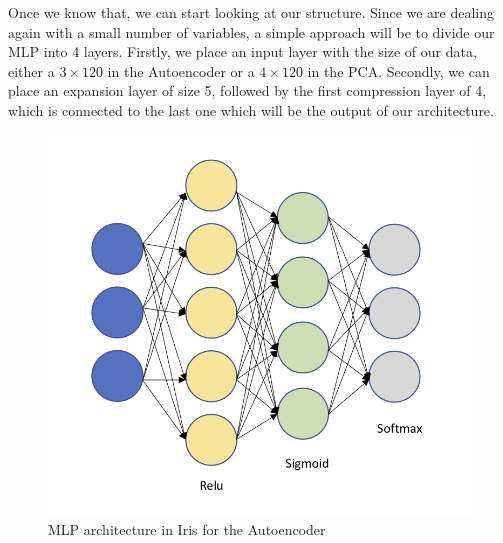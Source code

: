 Once we know that, we can start looking at our structure. Since we are dealing again with a small number of variables, a simple approach will be to divide our MLP into 4 layers. Firstly, we place an input layer with the size of our data, either a $3\times120$ in the Autoencoder or a $4\times120$ in the PCA. Secondly, we can place an expansion layer of size 5, followed by the first compression layer of 4, which is connected to the last one which will be the output of our architecture. \par
%
\begin{figure}[H]
	\includegraphics[width=0.8\linewidth]{Figuras_tfg/Example_MLP_Auto.png}
	\caption{MLP architecture in Iris for the Autoencoder}
	\label{fig:figure_MLP_Iris_Autoencoder}
\end{figure}

